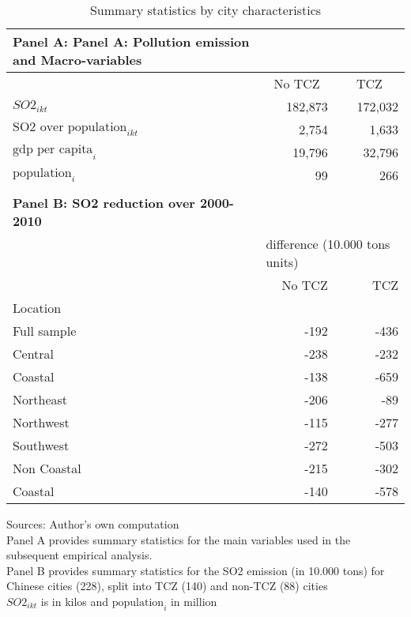 \documentclass[12pt]{article}
\begin{document}
\begin{table}[!htbp] \centering
    \caption{\\ Summary statistics by city characteristics}
      \begin{adjustbox}{width=\textwidth, totalheight=\baselineskip,keepaspectratio}
    \label{tab:table_3}
    \begin{tabular}{lrr}
      \multicolumn{1}{l}{\textbf{\small Panel A: Panel A: Pollution emission and Macro-variables}} \\
      \toprule
      & \multicolumn{1}{c}{No TCZ} & \multicolumn{1}{c}{TCZ} \\
      \midrule
      $SO2_{ikt}$  & 182,873 & 172,032 \\
      $\text{SO2 over population}_{ikt}$ &   2,754 &   1,633 \\
      $\text{gdp per capita}_i$ &  19,796 &  32,796 \\
      $\text{population}_i$ &      99 &     266 \\
      \bottomrule
      \\ %
      \multicolumn{1}{l}{\textbf{\small Panel B: SO2 reduction over 2000-2010}} \\
      \toprule
      {} & \multicolumn{2}{l}{\footnotesize difference (10.000 tons units)} \\
                  & No TCZ   & TCZ     \\
      Location    &          &         \\
      \midrule
      Full sample &    -192 & -436  \\
      Central     &    -238 & -232 \\
      Coastal     &    -138 & -659  \\
      Northeast   &    -206 &  -89 \\
      Northwest   &    -115 & -277  \\
      Southwest   &    -272 & -503 \\
      Non Coastal &    -215 & -302  \\
      Coastal     &    -140 & -578  \\
      \bottomrule
      \hline
    \end{tabular}
    \end{adjustbox}
    \begin{tablenotes}
      \small
      \item 
      Sources: Author's own computation \\
      Panel A provides summary statistics for the main variables used in the subsequent empirical analysis. \\
  Panel B provides summary statistics for the SO2 emission (in 10.000 tons) for Chinese cities (228), split into TCZ (140) and non-TCZ (88) cities \\
  $SO2_{ikt}$ is in kilos and $\text{population}_i$ in million
      \\
    \end{tablenotes}
\end{table}
\end{document}
